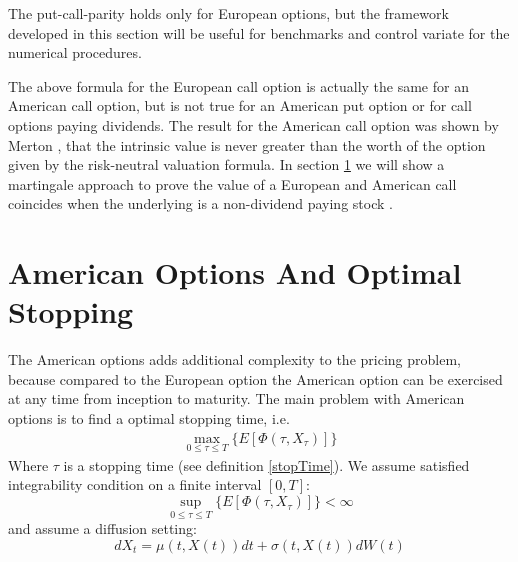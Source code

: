 The put-call-parity holds only for European options, but the framework developed in this section will be useful for benchmarks and control variate for the numerical procedures.

The above formula for the European call option is actually the same for an American call option, but is not true for an American put option or for call options paying dividends. The result for the American call option was shown by Merton \parencite{Merton73}, that the intrinsic value is never greater than the worth of the option given by the risk-neutral valuation formula. In section \ref{AmericanOptions} we will show a martingale approach to prove the value of a European and American call coincides when the underlying is a non-dividend paying stock \parencite{finKont}.


\section{American Options And Optimal Stopping}\label{AmericanOptions}
The American options adds additional complexity to the pricing problem, because compared to the European option the American option can be exercised at any time from inception to maturity. The main problem with American options is to find a optimal stopping time, i.e.
\begin{align}
\max_{0 \leq \tau\leq T}\{E[\Phi(\tau,X_{\tau})]\}
\end{align}
Where $\tau$ is a stopping time (see definition \ref{stopTime}).
We assume satisfied integrability condition on a finite interval $[0,T]$:
$$\sup_{0 \leq \tau\leq T}\{E[\Phi(\tau,X_\tau)]\}<\infty$$
and assume a diffusion setting:
$$dX_t=\mu(t,X(t))dt + \sigma(t,X(t))dW(t)$$

